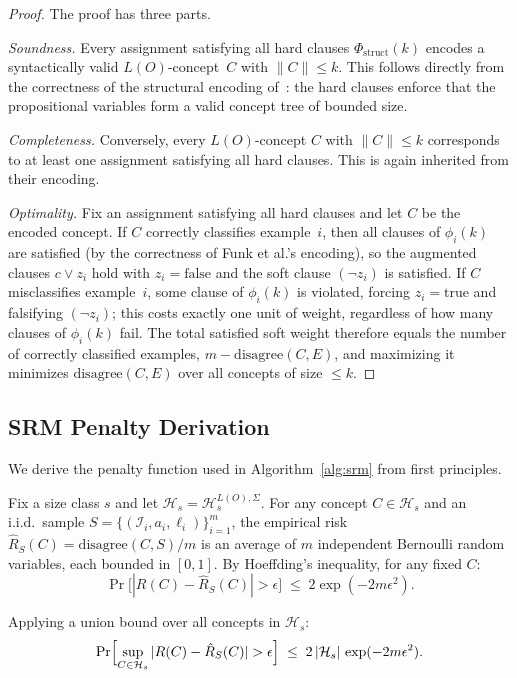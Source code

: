 \documentclass[accepted]{uai2026} %
\theoremstyle{definition}
\theoremstyle{remark}
\newcommand{\disagree}{\mathrm{disagree}}
\begin{document}
\begin{proof}
  The proof has three parts.

  \emph{Soundness.} Every assignment satisfying
  all hard clauses $\Phi_{\mathrm{struct}}(k)$ encodes a
  syntactically valid $L(O)$-concept~$C$ with $\|C\| \leq k$.
  This follows directly from the correctness of the structural
  encoding of~\citet{DBLP:conf/semweb/FunkJV25}: the hard
  clauses enforce that the propositional variables form a
  valid concept tree of bounded size.

  \emph{Completeness.} Conversely, every
  $L(O)$-concept $C$ with $\|C\| \leq k$ corresponds to at
  least one assignment satisfying all hard clauses.  This
  is again inherited from their encoding.

  \emph{Optimality.} Fix an assignment
  satisfying all hard clauses and let $C$ be the encoded concept.
  If $C$ correctly classifies example~$i$, then all clauses of
  $\phi_i(k)$ are satisfied (by the correctness of Funk et al.'s
  encoding), so the augmented clauses $c \vee z_i$ hold with
  $z_i = \text{false}$ and the soft clause $(\neg z_i)$ is
  satisfied. If $C$ misclassifies example~$i$, some clause of
  $\phi_i(k)$ is violated, forcing $z_i = \text{true}$ and
  falsifying $(\neg z_i)$; this costs exactly one unit of weight,
  regardless of how many clauses of $\phi_i(k)$ fail. The total
  satisfied soft weight therefore equals the number of correctly
  classified examples, $m - \disagree(C, E)$, and maximizing it
  minimizes $\disagree(C, E)$ over all concepts of size
  $\leq k$.
\end{proof}

\subsection{SRM Penalty Derivation}\label{app:penalty}

We derive the penalty function used in
Algorithm~\ref{alg:srm} from first principles.

Fix a size class $s$ and let
$\mathcal{H}_s = \mathcal{H}_s^{L(O),\Sigma}$.
For any concept $C \in \mathcal{H}_s$ and an i.i.d.\ sample
$S = \{(\mathcal{I}_i, a_i, \ell_i)\}_{i=1}^m$, the empirical
risk $\hat{R}_S(C) = \disagree(C, S)/m$ is an average of $m$
independent Bernoulli random variables, each bounded in $[0,1]$.
By Hoeffding's inequality, for any fixed $C$:
\[
  \Pr\bigl[|R(C) - \hat{R}_S(C)| > \epsilon\bigr]
  \;\leq\; 2 \exp(-2m\epsilon^2).
\]

Applying a union bound over all concepts in
$\mathcal{H}_s$:
\[
  \Pr\Bigl[\sup_{C \in \mathcal{H}_s}
  |R(C) - \hat{R}_S(C)| > \epsilon\Bigr]
  \;\leq\; 2\,|\mathcal{H}_s|\,\exp(-2m\epsilon^2).
\]
\end{document}
